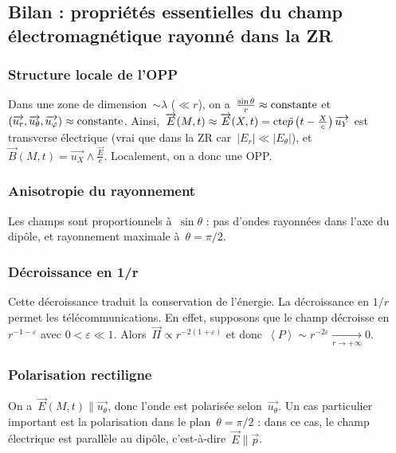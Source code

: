 \subsection{Bilan : propriétés essentielles du champ électromagnétique rayonné dans la ZR}

\subsubsection{Structure locale de l'OPP}

Dans une zone de dimension~$\sim\lambda$ ($\ll r$), on a~$\frac{\sin\theta}{r}\approx{\rm constante}$ et~$(\vec{u_r},\vec{u_{\theta}},\vec{u_{\varphi}})\approx{\rm constante}$. Ainsi,~$\vec{E}(M,t)\approx\vec{E}(X,t)={\rm cte}\ddot{p}\left(t-\frac{X}{c}\right)\vec{u_{Y}}$ est transverse électrique (vrai que dans la ZR car~$\left\lvert E_r\right\rvert\ll\left\lvert E_{\theta}\right\rvert$), et ~$\vec{B}(M,t)=\vec{u_X}\wedge\frac{\vec{E}}{c}$. Localement, on a donc une OPP.

\subsubsection{Anisotropie du rayonnement}

Les champs sont proportionnels à~$\sin\theta$ : pas d'ondes rayonnées dans l'axe du dipôle, et rayonnement maximale à~$\theta=\pi/2$.

\subsubsection{Décroissance en 1/r}

Cette décroissance traduit la conservation de l'énergie. La décroissance en $1/r$ permet les télécommunications. En effet, supposons que le champ décroisse en~$r^{-1-\varepsilon}$ avec $0<\varepsilon\ll1$. Alors~$\vec{\Pi}\propto r^{-2(1+\varepsilon)}$ et donc~$\left\langle P\right\rangle\sim r^{-2\varepsilon}\xrightarrow[r\to+\infty]{}0$.

\subsubsection{Polarisation rectiligne}

On a~$\vec{E}(M,t)\parallel\vec{u_{\theta}}$, donc l'onde est polarisée selon~$\vec{u_{\theta}}$. Un cas particulier important est la polarisation dans le plan~$\theta=\pi/2$ : dans ce cas, le champ électrique est parallèle au dipôle, c'est-à-dire~$\vec{E}\parallel\vec{p}$.

